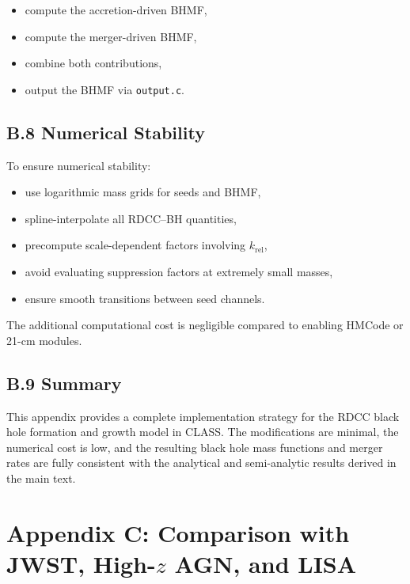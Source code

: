 \documentclass[11pt,a4paper]{article}
\begin{document}
\begin{itemize}
    \item compute the accretion-driven BHMF,
    \item compute the merger-driven BHMF,
    \item combine both contributions,
    \item output the BHMF via \texttt{output.c}.
\end{itemize}

\subsection*{B.8 Numerical Stability}

To ensure numerical stability:

\begin{itemize}
    \item use logarithmic mass grids for seeds and BHMF,
    \item spline-interpolate all RDCC–BH quantities,
    \item precompute scale-dependent factors involving $k_{\mathrm{rel}}$,
    \item avoid evaluating suppression factors at extremely small masses,
    \item ensure smooth transitions between seed channels.
\end{itemize}

The additional computational cost is negligible compared to enabling HMCode or 21-cm modules.

\subsection*{B.9 Summary}

This appendix provides a complete implementation strategy for the RDCC black hole formation 
and growth model in CLASS. The modifications are minimal, the numerical cost is low, and the 
resulting black hole mass functions and merger rates are fully consistent with the analytical 
and semi-analytic results derived in the main text.

\section*{Appendix C: Comparison with JWST, High-$z$ AGN, and LISA}
\end{document}
